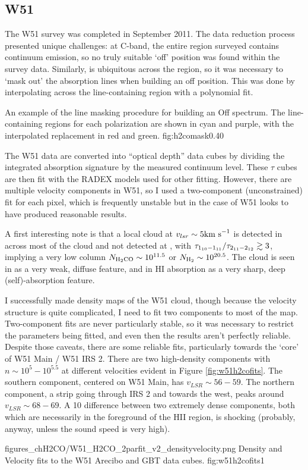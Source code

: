 \subsection{W51}
The W51 survey was completed in September 2011.  The data reduction process
presented unique challenges: at C-band, the entire region surveyed contains
continuum emission, so no truly suitable `off' position was found within the
survey data.  Similarly, \formaldehyde is ubiquitous across the region, so it
was necessary to `mask out' the absorption lines when building an off position.
This was done by interpolating across the line-containing region with a
polynomial fit.  

{An example of the \formaldehyde line masking procedure for building an Off
spectrum.  The line-containing regions for each polarization are shown in cyan
and purple, with the interpolated replacement in red and green.
}{fig:h2comask}{0.4}{0}

The W51 data are converted into ``optical depth'' data cubes by dividing the
integrated \formaldehyde absorption signature by the measured continuum level.
These $\tau$ cubes are then fit with the RADEX models used for other
\formaldehyde fitting.  However, there are multiple velocity components in W51,
so I used a two-component (unconstrained) fit for each pixel, which is
frequently unstable but in the case of W51 looks to have produced reasonable
results.

A first interesting note is that a local cloud at $v_{lsr}\sim5 \textrm{km~s}^{-1}$ is
detected in \formaldehyde \oneone across most of the cloud and not detected at
\twotwo, with $\tau_{1_{10}-1_{11}}/\tau_{2_{11}-2_{12}} \gtrsim 3$, implying a
very low column
$N_{\textrm{H}_2\textrm{CO}}\sim10^{11.5}$ or $N_{\textrm{H}_{2}} \sim 10^{20.5}$.  
The cloud is seen in \thirteenco as a very weak, diffuse feature, and in HI absorption
as a very sharp, deep (self)-absorption feature.


I successfully made density maps of the W51 cloud, though because the velocity
structure is quite complicated, I need to fit two components to most of the
map.  Two-component fits are never particularly stable, so it was necessary to
restrict the parameters being fitted, and even then the results aren't
perfectly reliable.  Despite those caveats, there are some reliable fits,
particularly towards the `core' of W51 Main / W51 IRS 2.  There are two
high-density components with $n\sim10^5-10^5.5$ at different velocities evident
in Figure \ref{fig:w51h2cofits}.  The southern component, centered on W51 Main,
has $v_{LSR}\sim56-59$.  The northern component, a strip going through IRS 2
and towards the west, peaks around $v_{LSR}\sim68-69$.  A 10 \kms difference
between two extremely dense components, both which are necessarily in the
foreground of the HII region, is shocking (probably, anyway, unless the sound
speed is very high).


{figures_chH2CO/W51_H2CO_2parfit_v2_densityvelocity.png}
{Density and Velocity fits to the W51 Arecibo and GBT \formaldehyde 
data cubes.  }
{fig:w51h2cofits}{1}



